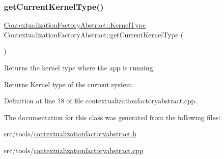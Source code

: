 \subsubsection{\texorpdfstring{get\+Current\+Kernel\+Type()}{getCurrentKernelType()}}
{\footnotesize\ttfamily \mbox{\hyperlink{classContextualizationFactoryAbstract_a87cd3e6ea2f582fe98286a73d3b28f60}{Contextualization\+Factory\+Abstract\+::\+Kernel\+Type}} Contextualization\+Factory\+Abstract\+::get\+Current\+Kernel\+Type (\begin{DoxyParamCaption}{ }\end{DoxyParamCaption})\hspace{0.3cm}{\ttfamily [protected]}}



Returns the kernel type where the app is running. 

\begin{DoxyReturn}{Returns}
Kernel type of the current system. 
\end{DoxyReturn}


Definition at line 18 of file contextualizationfactoryabstract.\+cpp.



The documentation for this class was generated from the following files\+:\begin{DoxyCompactItemize}
\item 
src/tools/\mbox{\hyperlink{contextualizationfactoryabstract_8h}{contextualizationfactoryabstract.\+h}}\item 
src/tools/\mbox{\hyperlink{contextualizationfactoryabstract_8cpp}{contextualizationfactoryabstract.\+cpp}}\end{DoxyCompactItemize}
